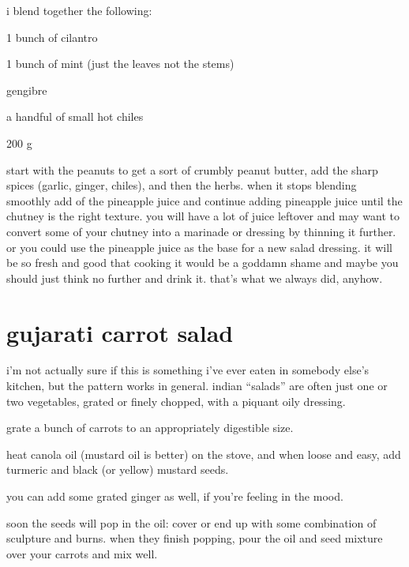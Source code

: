 i blend together the following:

\begin{ingredients}
  \item 1 bunch of cilantro
  \item 1 bunch of mint (just the leaves not the stems) 
  \item \onehalf {}
  \item \gls{gengibre}
  \item a handful of small hot chiles
  \item 200 g 
\end{ingredients}

start with the peanuts to get a sort of crumbly peanut butter, add the sharp 
spices (garlic, ginger, chiles), and then the herbs. when it stops blending 
smoothly add \onequarter of the pineapple juice and continue adding pineapple 
juice until the chutney is the right texture. you will have a lot of juice 
leftover and may want to convert some of your chutney into a marinade or 
dressing by thinning it further. or you could use the pineapple juice as the 
base for a new salad dressing. it will be so fresh and good that cooking it 
would be a goddamn shame and maybe you should just think no further and drink 
it. that's what we always did, anyhow.

\section{gujarati carrot salad}

i'm not actually sure if this is something i've ever eaten in somebody else's 
kitchen, but the pattern works in general. indian ``salads'' are often just one 
or two vegetables, grated or finely chopped, with a piquant oily dressing.

\begin{algorithm}
  \item grate a bunch of carrots to an appropriately digestible size.

  \item heat canola oil (mustard oil is better) on the stove, and when loose 
  and easy, add turmeric and black (or yellow) mustard seeds.

  \item you can add some grated ginger as well, if you're feeling in the mood.
\end{algorithm}

soon the seeds will pop in the oil: cover or end up with some combination of 
sculpture and burns. when they finish popping, pour the oil and seed mixture 
over your carrots and mix well.

